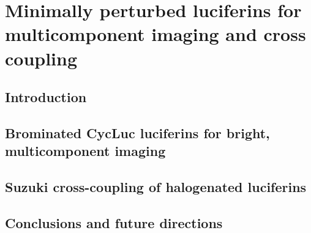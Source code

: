 
\chapter{Minimally perturbed luciferins for multicomponent imaging and cross coupling}
\section{Introduction}

\section{Brominated CycLuc luciferins for bright, multicomponent imaging}

\section{Suzuki cross-coupling of halogenated luciferins}

\section{Conclusions and future directions}




